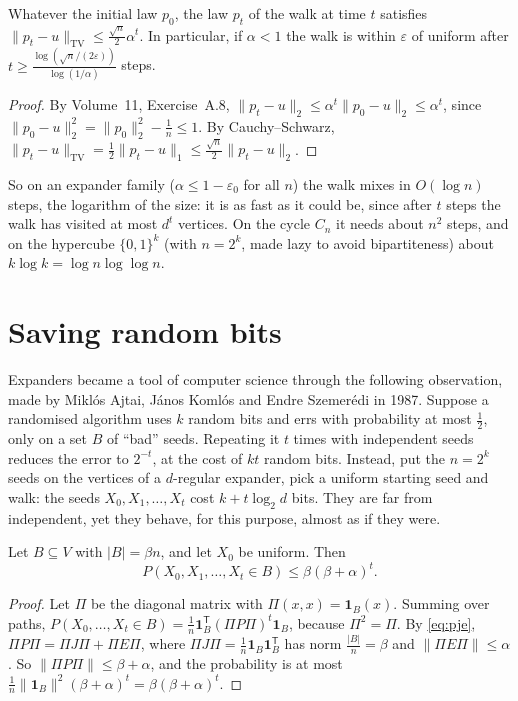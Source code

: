 \begin{proposition}[mixing]\label{prop:mixing}
Whatever the initial law $p_0$, the law $p_t$ of the walk at time $t$ satisfies $\|p_t-u\|_{\mathrm{TV}}\le\frac{\sqrt n}2\alpha^t$. In particular, if $\alpha<1$ the walk is within $\varepsilon$ of uniform after
$t\ge\frac{\log(\sqrt n/(2\varepsilon))}{\log(1/\alpha)}$ steps.
\end{proposition}

\begin{proof}
By Volume~11, Exercise~A.8, $\|p_t-u\|_2\le\alpha^t\|p_0-u\|_2\le\alpha^t$, since $\|p_0-u\|_2^2=\|p_0\|_2^2-\frac1n\le1$. By Cauchy--Schwarz, $\|p_t-u\|_{\mathrm{TV}}=\frac12\|p_t-u\|_1\le\frac{\sqrt n}2\|p_t-u\|_2$.
\end{proof}

So on an expander family ($\alpha\le1-\varepsilon_0$ for all $n$) the walk mixes in $O(\log n)$ steps, the logarithm of the size: it is as fast as it could be, since after $t$ steps the walk has visited at most
$d^t$ vertices. On the cycle $C_n$ it needs about $n^2$ steps, and on the hypercube $\{0,1\}^k$ (with $n=2^k$, made lazy to avoid bipartiteness) about $k\log k=\log n\log\log n$.

\section{Saving random bits}

Expanders became a tool of computer science through the following observation, made by Mikl\'os Ajtai, J\'anos Koml\'os and Endre Szemer\'edi in 1987. Suppose a randomised algorithm uses $k$ random bits and errs with
probability at most $\frac12$, only on a set $B$ of ``bad'' seeds. Repeating it $t$ times with independent seeds reduces the error to $2^{-t}$, at the cost of $kt$ random bits. Instead, put the $n=2^k$ seeds on the vertices of a
$d$-regular expander, pick a uniform starting seed and walk: the seeds $X_0,X_1,\dots,X_t$ cost $k+t\log_2d$ bits. They are far from independent, yet they behave, for this purpose, almost as if they were.

\begin{proposition}\label{prop:hitting}
Let $B\subseteq V$ with $|B|=\beta n$, and let $X_0$ be uniform. Then
\[
P(X_0,X_1,\dots,X_t\in B)\le\beta(\beta+\alpha)^t.
\]
\end{proposition}

\begin{proof}
Let $\Pi$ be the diagonal matrix with $\Pi(x,x)=\mathbf 1_B(x)$. Summing over paths, $P(X_0,\dots,X_t\in B)=\frac1n\mathbf 1_B^{\mathsf T}(\Pi P\Pi)^t\mathbf 1_B$, because $\Pi^2=\Pi$. By \eqref{eq:pje}, $\Pi P\Pi=\Pi J\Pi+\Pi E\Pi$, where
$\Pi J\Pi=\frac1n\mathbf 1_B\mathbf 1_B^{\mathsf T}$ has norm $\frac{|B|}n=\beta$ and $\|\Pi E\Pi\|\le\alpha$. So $\|\Pi P\Pi\|\le\beta+\alpha$, and the probability is at most $\frac1n\|\mathbf 1_B\|^2(\beta+\alpha)^t=\beta(\beta+\alpha)^t$.
\end{proof}

